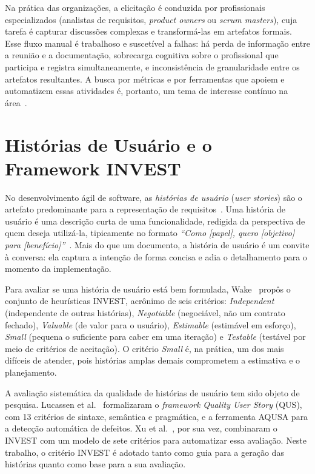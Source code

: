 Na prática das organizações, a elicitação é conduzida por profissionais especializados (analistas de requisitos, \textit{product owners} ou \textit{scrum masters}), cuja tarefa é capturar discussões complexas e transformá-las em artefatos formais. Esse fluxo manual é trabalhoso e suscetível a falhas: há perda de informação entre a reunião e a documentação, sobrecarga cognitiva sobre o profissional que participa e registra simultaneamente, e inconsistência de granularidade entre os artefatos resultantes. A busca por métricas e por ferramentas que apoiem e automatizem essas atividades é, portanto, um tema de interesse contínuo na área~\cite{bokhari2011metrics}.

\section{Histórias de Usuário e o Framework INVEST}
\label{sec:invest}

No desenvolvimento ágil de software, as \textit{histórias de usuário} (\textit{user stories}) são o artefato predominante para a representação de requisitos~\cite{cohn2004}. Uma história de usuário é uma descrição curta de uma funcionalidade, redigida da perspectiva de quem deseja utilizá-la, tipicamente no formato \textit{``Como [papel], quero [objetivo] para [benefício]''}~\cite{lucassen2016qus}. Mais do que um documento, a história de usuário é um convite à conversa: ela captura a intenção de forma concisa e adia o detalhamento para o momento da implementação.

Para avaliar se uma história de usuário está bem formulada, Wake~\cite{wake2003invest} propôs o conjunto de heurísticas INVEST, acrônimo de seis critérios: \textit{Independent} (independente de outras histórias), \textit{Negotiable} (negociável, não um contrato fechado), \textit{Valuable} (de valor para o usuário), \textit{Estimable} (estimável em esforço), \textit{Small} (pequena o suficiente para caber em uma iteração) e \textit{Testable} (testável por meio de critérios de aceitação). O critério \textit{Small} é, na prática, um dos mais difíceis de atender, pois histórias amplas demais comprometem a estimativa e o planejamento.

A avaliação sistemática da qualidade de histórias de usuário tem sido objeto de pesquisa. Lucassen et al.~\cite{lucassen2016qus} formalizaram o \textit{framework} \textit{Quality User Story} (QUS), com 13 critérios de sintaxe, semântica e pragmática, e a ferramenta AQUSA para a detecção automática de defeitos. Xu et al.~\cite{xu2023requirement}, por sua vez, combinaram o INVEST com um modelo de sete critérios para automatizar essa avaliação. Neste trabalho, o critério INVEST é adotado tanto como guia para a geração das histórias quanto como base para a sua avaliação.

